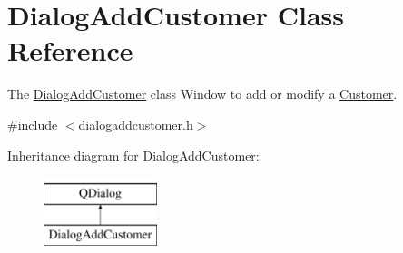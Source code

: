 \hypertarget{classDialogAddCustomer}{\section{Dialog\-Add\-Customer Class Reference}
\label{classDialogAddCustomer}
}


The \hyperlink{classDialogAddCustomer}{Dialog\-Add\-Customer} class Window to add or modify a \hyperlink{classCustomer}{Customer}.  




{\ttfamily \#include $<$dialogaddcustomer.\-h$>$}

Inheritance diagram for Dialog\-Add\-Customer\-:\begin{figure}[H]
\begin{center}
\leavevmode
\includegraphics[height=2.000000cm]{df/d01/classDialogAddCustomer}
\end{center}
\end{figure}
